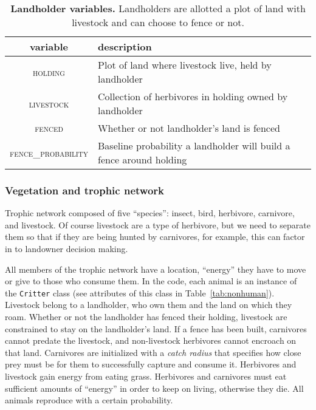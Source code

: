 \documentclass{article}
\begin{document}
\begin{table}[h]
  \caption{\textbf{Landholder variables.} Landholders are allotted a plot of
  land with livestock and can choose to fence or not.}
  \label{tab:landholders}
  \begin{tabular}{cl} \toprule
    variable & description \\ \midrule  
    \textsc{holding} & Plot of land where livestock live, held by landholder \\
    \textsc{livestock} & Collection of herbivores in holding owned by landholder \\
    \textsc{fenced} & Whether or not landholder's land is fenced \\
    \textsc{fence\_probability} & Baseline probability a landholder will build a
    fence around holding \\
    \bottomrule
  \end{tabular} 
\end{table}

\subsubsection{Vegetation and trophic network}

Trophic network composed of five ``species'': insect, bird, herbivore,
carnivore, and livestock. Of course livestock are a type of herbivore, but
we need to separate them so that if they are being hunted by carnivores,
for example, this can factor in to landowner decision making. 

All members of the trophic network have a location, ``energy'' 
they have to move or give to those who
consume them. In the code, each animal is an instance of the \texttt{Critter} 
class (see attributes of this class in Table~\ref{tab:nonhuman}). 
Livestock belong to a landholder, who own them
and the land on which they roam. Whether or not the landholder has fenced their
holding, livestock are constrained to stay on the landholder's land. If a fence
has been built, carnivores cannot predate the livestock, and non-livestock
herbivores cannot encroach on that land. Carnivores are initialized with a 
\emph{catch radius} that specifies how close prey must be for them to
successfully capture and consume it. Herbivores and livestock gain energy from 
eating grass. Herbivores and carnivores must eat sufficient amounts of
``energy'' in order to keep on living, otherwise they die. All animals
reproduce with a certain probability.
\end{document}
